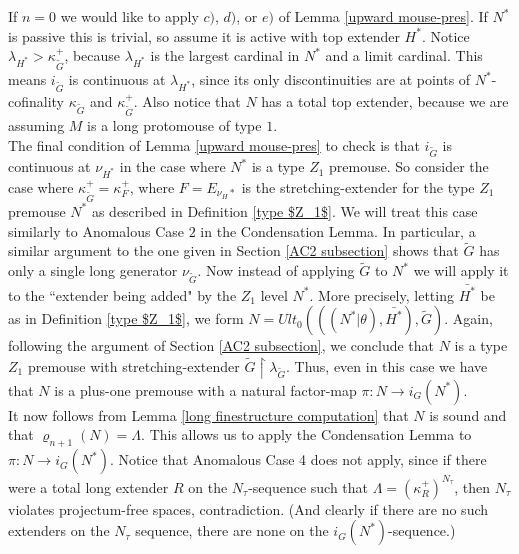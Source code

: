 \documentclass[12pt]{article}
\begin{document}
If $n = 0$ we would like to apply $c)$, $d)$, or $e)$ of Lemma \ref{upward mouse-pres}.  If $N^*$ is passive this is trivial, so assume it is active with top extender $H^*$.  Notice $\lambda_{H^*} > \kappa_{\tilde{G}}^+$, because $\lambda_{H^*}$ is the largest cardinal in $N^*$ and a limit cardinal.  This means $i_{\tilde{G}}$ is continuous at $\lambda_{H^*}$, since its only discontinuities are at points of $N^*$-cofinality $\kappa_{\tilde{G}}$ and $\kappa_{\tilde{G}}^+$.  Also notice that $N$ has a total top extender, because we are assuming $M$ is a long protomouse of type $1$.\\

The final condition of Lemma \ref{upward mouse-pres} to check is that $i_{\tilde{G}}$ is continuous at $\nu_{H^*}$ in the case where $N^*$ is a type $Z_1$ premouse.  So consider the case where $\kappa_{\tilde{G}}^+ = \kappa_F^+$, where $F = E_{\nu_H*}$ is the stretching-extender for the type $Z_1$ premouse $N^*$ as described in Definition \ref{type $Z_1$}.  We will treat this case similarly to Anomalous Case $2$ in the Condensation Lemma.  In particular, a similar argument to the one given in Section \ref{AC2 subsection} shows that $\tilde{G}$ has only a single long generator $\nu_{\tilde{G}}$.  Now instead of applying $\tilde{G}$ to $N^*$ we will apply it to the ``extender being added" by the $Z_1$ level $N^*$.  More precisely, letting $\bar{H^*}$ be as in Definition \ref{type $Z_1$}, we form $N = Ult_0 ( (( N^* | \theta ) , \bar{H^*} ) , \tilde{G})$.  Again, following the argument of Section \ref{AC2 subsection}, we conclude that $N$ is a type $Z_1$ premouse with stretching-extender $\tilde{G} \restriction \lambda_{\tilde{G}}$.  Thus, even in this case we have that $N$ is a plus-one premouse with a natural factor-map $\pi : N \longrightarrow i_G (N^*)$.\\

It now follows from Lemma \ref{long finestructure computation} that $N$ is sound and that $\varrho_{n+1} (N) = \Lambda$.  This allows us to apply the Condensation Lemma to $\pi : N \longrightarrow i_G (N^*)$.  Notice that Anomalous Case 4 does not apply, since if there were a total long extender $R$ on the $N_\tau$-sequence such that $\Lambda = (\kappa_R^+)^{N_\tau}$, then $N_\tau$ violates projectum-free spaces, contradiction.  (And clearly if there are no such extenders on the $N_\tau$ sequence, there are none on the $i_G (N^*)$-sequence.)\\
\end{document}
